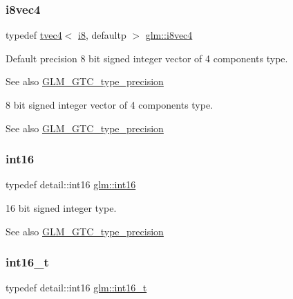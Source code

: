 \subsubsection{\texorpdfstring{i8vec4}{i8vec4}}
{\footnotesize\ttfamily typedef \hyperlink{structglm_1_1tvec4}{tvec4}$<$ \hyperlink{group__gtc__type__precision_gaae064be68b7d36cd7910c16e8ad18bba}{i8}, defaultp $>$ \hyperlink{group__gtc__type__precision_gafbf10a778016eba57d44beb585f2dc49}{glm\+::i8vec4}}

Default precision 8 bit signed integer vector of 4 components type. \begin{DoxySeeAlso}{See also}
\hyperlink{group__gtc__type__precision}{G\+L\+M\+\_\+\+G\+T\+C\+\_\+type\+\_\+precision}
\end{DoxySeeAlso}
8 bit signed integer vector of 4 components type. \begin{DoxySeeAlso}{See also}
\hyperlink{group__gtc__type__precision}{G\+L\+M\+\_\+\+G\+T\+C\+\_\+type\+\_\+precision} 
\end{DoxySeeAlso}
\mbox{\label{group__gtc__type__precision_ga2945a61d12771f8954994fcddf02b021}} 
\subsubsection{\texorpdfstring{int16}{int16}}
{\footnotesize\ttfamily typedef detail\+::int16 \hyperlink{group__gtc__type__precision_ga2945a61d12771f8954994fcddf02b021}{glm\+::int16}}

16 bit signed integer type. \begin{DoxySeeAlso}{See also}
\hyperlink{group__gtc__type__precision}{G\+L\+M\+\_\+\+G\+T\+C\+\_\+type\+\_\+precision} 
\end{DoxySeeAlso}
\mbox{\label{group__gtc__type__precision_gaf89ee61e0d34aa4a462104b7ae7f2da6}} 
\subsubsection{\texorpdfstring{int16\+\_\+t}{int16\_t}}
{\footnotesize\ttfamily typedef detail\+::int16 \hyperlink{group__gtc__type__precision_gaf89ee61e0d34aa4a462104b7ae7f2da6}{glm\+::int16\+\_\+t}}

